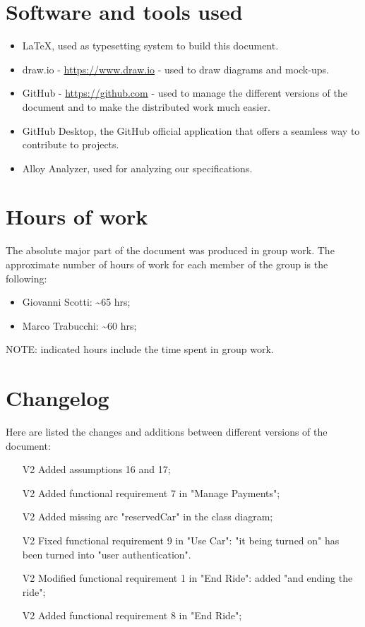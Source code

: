\section{Software and tools used}
\begin{itemize}
\item \LaTeX, used as typesetting system to build this document.
\item draw.io - \url{https://www.draw.io} - used to draw diagrams and mock-ups.
\item GitHub - \url{https://github.com} - used to manage the different versions of the document and to make the distributed work much easier.
\item GitHub Desktop, the GitHub official application that offers a seamless way to contribute to projects.
\item Alloy Analyzer, used for analyzing our specifications.
\end{itemize}
\section{Hours of work}
The absolute major part of the document was produced in group work. The approximate number of hours of work for each member of the group is the following:

\begin{itemize}
\item Giovanni Scotti: \textasciitilde 65 hrs;
\item Marco Trabucchi: \textasciitilde 60 hrs;
\end{itemize}

NOTE: indicated hours include the time spent in group work.

\section{Changelog}
Here are listed the changes and additions between different versions of the document:
\begin{itemize}
\item[V2] Added assumptions 16 and 17;
\item[V2] Added functional requirement 7 in "Manage Payments";
\item[V2] Added missing arc "reservedCar" in the class diagram;
\item[V2] Fixed functional requirement 9 in "Use Car": "it being turned on" has been turned into "user authentication".
\item[V2] Modified functional requirement 1 in "End Ride": added "and ending the ride";
\item[V2] Added functional requirement 8 in "End Ride";
\end{itemize}
